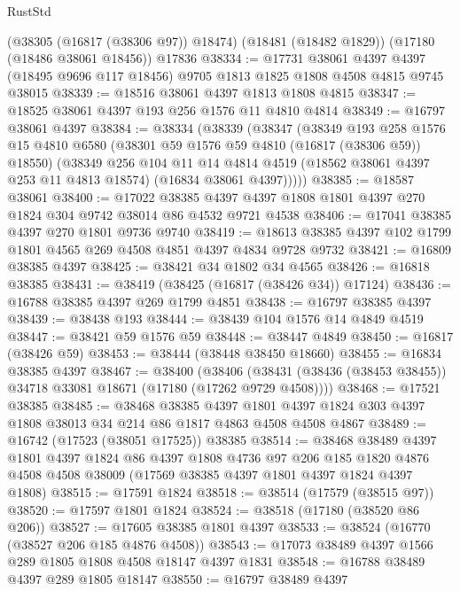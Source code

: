 \begin{lexlean}{RustStd}
\begin{coremodule}
{\begin{coremodule}
{{{{{{{{{{{{{{{{{{{{{{{{{{{{{{{{{{{{{{{{{{{{{{{{{{{{{{{    (@38305 (@16817 (@38306 @97)) @18474)
    (@18481 (@18482 @1829))
    (@17180 (@18486 @38061 @18456))
    @17836
@38334 := @17731
    @38061
    @4397
    @4397
    (@18495 @9696 @117 @18456)
    @9705
    @1813
    @1825
    @1808
    @4508
    @4815
    @9745
    @38015
@38339 := @18516 @38061 @4397 @1813 @1808 @4815
@38347 := @18525 @38061 @4397 @193 @256 @1576 @11 @4810 @4814
@38349 := @16797 @38061 @4397
@38384 := @38334
    (@38339
      (@38347
        (@38349
          @193
          @258
          @1576
          @15
          @4810
          @6580
          (@38301 @59 @1576 @59 @4810 (@16817 (@38306 @59)) @18550)
          (@38349
            @256
            @104
            @11
            @14
            @4814
            @4519
            (@18562 @38061 @4397 @253 @11 @4813 @18574)
            (@16834 @38061 @4397)))))
@38385 := @18587 @38061
@38400 := @17022
    @38385
    @4397
    @4397
    @1808
    @1801
    @4397
    @270
    @1824
    @304
    @9742
    @38014
    @86
    @4532
    @9721
    @4538
@38406 := @17041 @38385 @4397 @270 @1801 @9736 @9740
@38419 := @18613 @38385 @4397 @102 @1799 @1801 @4565 @269 @4508 @4851 @4397 @4834 @9728 @9732
@38421 := @16809 @38385 @4397
@38425 := @38421 @34 @1802 @34 @4565
@38426 := @16818 @38385
@38431 := @38419 (@38425 (@16817 (@38426 @34)) @17124)
@38436 := @16788 @38385 @4397 @269 @1799 @4851
@38438 := @16797 @38385 @4397
@38439 := @38438 @193
@38444 := @38439 @104 @1576 @14 @4849 @4519
@38447 := @38421 @59 @1576 @59
@38448 := @38447 @4849
@38450 := @16817 (@38426 @59)
@38453 := @38444 (@38448 @38450 @18660)
@38455 := @16834 @38385 @4397
@38467 := @38400
    (@38406 (@38431 (@38436 (@38453 @38455)) @34718 @33081 @18671 (@17180 (@17262 @9729 @4508))))
@38468 := @17521 @38385
@38485 := @38468
    @38385
    @4397
    @1801
    @4397
    @1824
    @303
    @4397
    @1808
    @38013
    @34
    @214
    @86
    @1817
    @4863
    @4508
    @4508
    @4867
@38489 := @16742 (@17523 (@38051 @17525)) @38385
@38514 := @38468
    @38489
    @4397
    @1801
    @4397
    @1824
    @86
    @4397
    @1808
    @4736
    @97
    @206
    @185
    @1820
    @4876
    @4508
    @4508
    @38009
    (@17569 @38385 @4397 @1801 @4397 @1824 @4397 @1808)
@38515 := @17591 @1824
@38518 := @38514 (@17579 (@38515 @97))
@38520 := @17597 @1801 @1824
@38524 := @38518 (@17180 (@38520 @86 @206))
@38527 := @17605 @38385 @1801 @4397
@38533 := @38524 (@16770 (@38527 @206 @185 @4876 @4508))
@38543 := @17073 @38489 @4397 @1566 @289 @1805 @1808 @4508 @18147 @4397 @1831
@38548 := @16788 @38489 @4397 @289 @1805 @18147
@38550 := @16797 @38489 @4397
}}}}}}}}}}}}}}}}}}}}}}}}}}}}}}}}}}}}}}}}}}}}}}}}}}}}}}}
\end{coremodule}}
\end{coremodule}
\end{lexlean}

